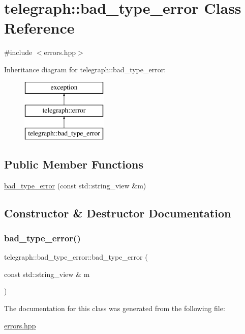 \hypertarget{classtelegraph_1_1bad__type__error}{}\section{telegraph\+:\+:bad\+\_\+type\+\_\+error Class Reference}
\label{classtelegraph_1_1bad__type__error}


{\ttfamily \#include $<$errors.\+hpp$>$}

Inheritance diagram for telegraph\+:\+:bad\+\_\+type\+\_\+error\+:\begin{figure}[H]
\begin{center}
\leavevmode
\includegraphics[height=3.000000cm]{classtelegraph_1_1bad__type__error}
\end{center}
\end{figure}
\subsection*{Public Member Functions}
\begin{DoxyCompactItemize}
\item 
\hyperlink{classtelegraph_1_1bad__type__error_a76c0b081a2d07635a4c587f987fbad42}{bad\+\_\+type\+\_\+error} (const std\+::string\+\_\+view \&m)
\end{DoxyCompactItemize}


\subsection{Constructor \& Destructor Documentation}
\mbox{\label{classtelegraph_1_1bad__type__error_a76c0b081a2d07635a4c587f987fbad42}} 
\subsubsection{\texorpdfstring{bad\+\_\+type\+\_\+error()}{bad\_type\_error()}}
{\footnotesize\ttfamily telegraph\+::bad\+\_\+type\+\_\+error\+::bad\+\_\+type\+\_\+error (\begin{DoxyParamCaption}\item[{const std\+::string\+\_\+view \&}]{m }\end{DoxyParamCaption})\hspace{0.3cm}{\ttfamily [inline]}}



The documentation for this class was generated from the following file\+:\begin{DoxyCompactItemize}
\item 
\hyperlink{errors_8hpp}{errors.\+hpp}\end{DoxyCompactItemize}
